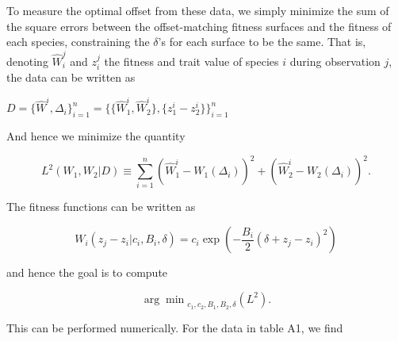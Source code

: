 \documentclass[]{article}
\begin{document}
To measure the optimal offset from these data, we simply minimize the
sum of the square errors between the offset-matching fitness surfaces
and the fitness of each species, constraining the \(\delta\)'s for each
surface to be the same. That is, denoting \(\hat W_i^j\) and \(z_i^j\)
the fitness and trait value of species \(i\) during observation \(j\),
the data can be written as

\(D=\{\hat W^i,\Delta_i\}_{i=1}^n=\{\{\hat W_1^i,\hat W_2^i\},\{z_1^i-z_2^i\}\}_{i=1}^n\)

And hence we minimize the quantity

\[L^2(W_1,W_2|D)\equiv\sum_{i=1}^n\left(\hat W_1^i-W_1(\Delta_i)\right)^2+\left(\hat W_2^i-W_2(\Delta_i)\right)^2.\]

The fitness functions can be written as

\[W_i(z_j-z_i|c_i,B_i,\delta)=c_i\exp\left(-\frac{B_i}{2}(\delta+z_j-z_i)^2\right)\]

and hence the goal is to compute

\[{\arg\min}_{c_1,c_2,B_1,B_2,\delta}(L^2).\]

This can be performed numerically. For the data in table A1, we find
\end{document}
